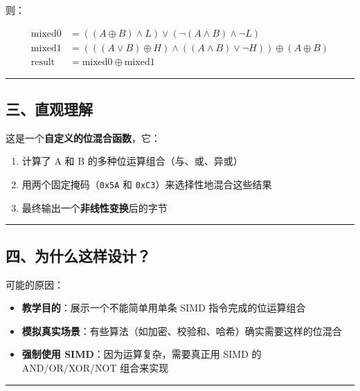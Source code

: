 \documentclass[11pt, a4paper]{article}
\begin{document}
\begin{aibox}
则：

\begin{tcolorbox}[colback=white,colframe=gray!50!white,boxrule=0.5pt,arc=2pt,left=5pt,right=5pt,top=5pt,bottom=5pt]
\[
\begin{aligned}
\text{mixed0} &= ( (A \oplus B) \land L ) \lor ( \neg(A \land B) \land \neg L ) \\
\text{mixed1} &= ( ((A \lor B) \oplus H) \land ((A \land B) \lor \neg H) ) \oplus (A \oplus B) \\
\text{result} &= \text{mixed0} \oplus \text{mixed1}
\end{aligned}
\]
\end{tcolorbox}

\begin{center}\rule{\textwidth}{0.4pt}\end{center}

\subsection*{三、直观理解}

这是一个\textbf{自定义的位混合函数}，它：
\begin{enumerate}
    \item 计算了 A 和 B 的多种位运算组合（与、或、异或）
    \item 用两个固定掩码（\texttt{0x5A} 和 \texttt{0xC3}）来选择性地混合这些结果
    \item 最终输出一个\textbf{非线性变换}后的字节
\end{enumerate}

\begin{center}\rule{\textwidth}{0.4pt}\end{center}

\subsection*{四、为什么这样设计？}

可能的原因：
\begin{itemize}
    \item \textbf{教学目的}：展示一个不能简单用单条 SIMD 指令完成的位运算组合
    \item \textbf{模拟真实场景}：有些算法（如加密、校验和、哈希）确实需要这样的位混合
    \item \textbf{强制使用 SIMD}：因为运算复杂，需要真正用 SIMD 的 AND/OR/XOR/NOT 组合来实现
\end{itemize}

\begin{center}\rule{\textwidth}{0.4pt}\end{center}


\end{aibox}
\end{document}
